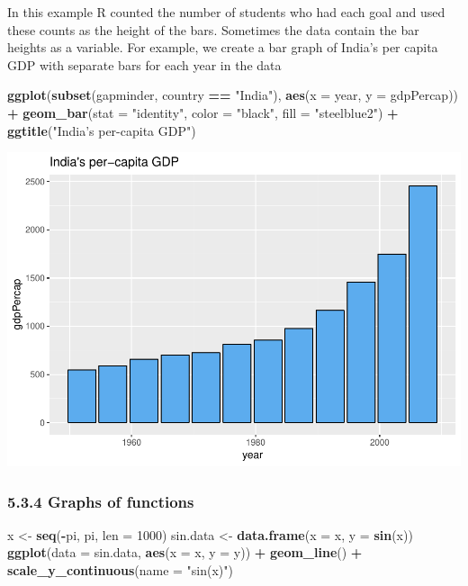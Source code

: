 \documentclass[]{article}
\newenvironment{Shaded}{\begin{snugshade}}{\end{snugshade}}
\newcommand{\KeywordTok}[1]{\textcolor[rgb]{0.13,0.29,0.53}{\textbf{#1}}}
\newcommand{\DataTypeTok}[1]{\textcolor[rgb]{0.13,0.29,0.53}{#1}}
\newcommand{\DecValTok}[1]{\textcolor[rgb]{0.00,0.00,0.81}{#1}}
\newcommand{\StringTok}[1]{\textcolor[rgb]{0.31,0.60,0.02}{#1}}
\newcommand{\OperatorTok}[1]{\textcolor[rgb]{0.81,0.36,0.00}{\textbf{#1}}}
\newcommand{\NormalTok}[1]{#1}
\begin{document}
In this example R counted the number of students who had each goal and
used these counts as the height of the bars. Sometimes the data contain
the bar heights as a variable. For example, we create a bar graph of
India's per capita GDP with separate bars for each year in the data

\begin{Shaded}
\begin{Highlighting}[]
\KeywordTok{ggplot}\NormalTok{(}\KeywordTok{subset}\NormalTok{(gapminder, country }\OperatorTok{==}\StringTok{ "India"}\NormalTok{), }\KeywordTok{aes}\NormalTok{(}\DataTypeTok{x =}\NormalTok{ year, }\DataTypeTok{y =}\NormalTok{ gdpPercap)) }\OperatorTok{+}
\StringTok{  }\KeywordTok{geom_bar}\NormalTok{(}\DataTypeTok{stat =} \StringTok{"identity"}\NormalTok{, }\DataTypeTok{color =} \StringTok{"black"}\NormalTok{, }\DataTypeTok{fill =} \StringTok{"steelblue2"}\NormalTok{) }\OperatorTok{+}
\StringTok{  }\KeywordTok{ggtitle}\NormalTok{(}\StringTok{"India's per-capita GDP"}\NormalTok{)}
\end{Highlighting}
\end{Shaded}

\includegraphics{stt-301-programming_files/figure-latex/unnamed-chunk-73-1.pdf}

\subsubsection{5.3.4 Graphs of functions}\label{graphs-of-functions}

\begin{Shaded}
\begin{Highlighting}[]
\NormalTok{x <-}\StringTok{ }\KeywordTok{seq}\NormalTok{(}\OperatorTok{-}\NormalTok{pi, pi, }\DataTypeTok{len =} \DecValTok{1000}\NormalTok{)}
\NormalTok{sin.data <-}\StringTok{ }\KeywordTok{data.frame}\NormalTok{(}\DataTypeTok{x =}\NormalTok{ x, }\DataTypeTok{y =} \KeywordTok{sin}\NormalTok{(x))}
\KeywordTok{ggplot}\NormalTok{(}\DataTypeTok{data =}\NormalTok{ sin.data, }\KeywordTok{aes}\NormalTok{(}\DataTypeTok{x =}\NormalTok{ x, }\DataTypeTok{y =}\NormalTok{ y)) }\OperatorTok{+}\StringTok{ }\KeywordTok{geom_line}\NormalTok{() }\OperatorTok{+}
\StringTok{  }\KeywordTok{scale_y_continuous}\NormalTok{(}\DataTypeTok{name =} \StringTok{"sin(x)"}\NormalTok{)}
\end{Highlighting}
\end{Shaded}
\end{document}
